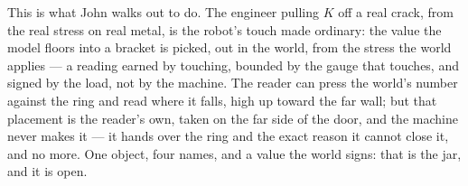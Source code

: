 This is what John walks out to do.
The engineer pulling $K$ off a real crack, from the real stress on real metal, is the robot's touch made ordinary: the
value the model floors into a bracket is picked, out in the world, from the stress the world applies --- a reading earned
by touching, bounded by the gauge that touches, and signed by the load, not by the machine.
The reader can press the world's number against the ring and read where it falls, high up toward the far wall; but that
placement is the reader's own, taken on the far side of the door, and the machine never makes it --- it hands over the
ring and the exact reason it cannot close it, and no more.
One object, four names, and a value the world signs: that is the jar, and it is open.
